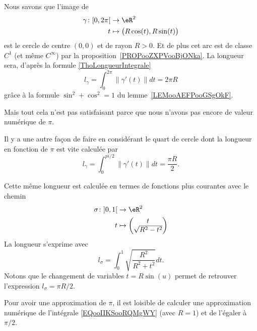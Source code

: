 \begin{example}
	Nous savons que l'image de
	\begin{equation}
		\begin{aligned}
			\gamma\colon \mathopen[ 0 , 2\pi \mathclose[ & \to \eR^2                             \\
			t                                            & \mapsto \big( R\cos(t),R\sin(t) \big)
		\end{aligned}
	\end{equation}
	est le cercle de centre \( (0,0)\) et de rayon \( R>0\). Et de plus cet arc est de classe \( C^1\) (et même \(  C^{\infty}\)) par la proposition~\ref{PROPooZXPVooBjONka}. La longueur sera, d'après la formule \eqref{ThoLongueurIntegrale}
	\begin{equation}
		l_{\gamma}=\int_0^{2\pi}\| \gamma'(t) \|dt=2\pi R
	\end{equation}
	grâce à la formule \( \sin^2+\cos^2=1\) du lemme~\ref{LEMooAEFPooGSgOkF}.

	Mais tout cela n'est pas satisfaisant parce que nous n'avons pas encore de valeur numérique de \( \pi\).

	Il y a une autre façon de faire en considérant le quart de cercle dont la longueur en fonction de \( \pi\) est vite calculée par
	\begin{equation}
		l_{\gamma}=\int_0^{pi/2}\| \gamma'(t) \|dt=\frac{ \pi R }{ 2 }.
	\end{equation}

	Cette même longueur est calculée en termes de fonctions plus courantes avec le chemin
	\begin{equation}
		\begin{aligned}
			\sigma\colon \mathopen] 0 , 1 \mathclose[ & \to \eR^2                          \\
			t                                         & \mapsto \begin{pmatrix}
				t \\
				\sqrt{ R^2-t^2 }
			\end{pmatrix}
		\end{aligned}
	\end{equation}
	La longueur s'exprime avec
	\begin{equation}        \label{EQooIIKSooRQMgWY}
		l_{\sigma}=\int_0^1\sqrt{ \frac{ R^2 }{ R^2+t^2 } }dt.
	\end{equation}
	Notons que le changement de variables \( t=R\sin(u)\) permet de retrouver l'expression \( l_{\sigma}=\pi R/2\).

	Pour avoir une approximation de \( \pi\), il est loisible de calculer une approximation numérique de l'intégrale \eqref{EQooIIKSooRQMgWY} (avec \( R=1\)) et de l'égaler à \( \pi/2\).
\end{example}


